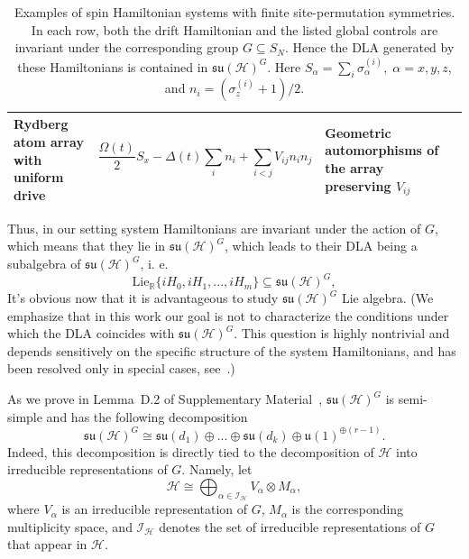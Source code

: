 \documentclass[10pt,twocolumn,superscriptaddress,aps,amsmath,amssymb,citeautoscript,floatfix,prx,longbibliography]{revtex4-2}
\newcounter{alg}
\theoremstyle{plain}
\theoremstyle{plain}
\theoremstyle{plain}
\theoremstyle{plain}
\theoremstyle{plain}
\theoremstyle{plain}
\begin{document}
\begin{table}[t]
\begin{tabular}{llll}
\parbox[t]{0.19\textwidth}{Rydberg atom array with uniform drive}
&
\parbox[t]{0.38\textwidth}{
\[
\frac{\Omega(t)}{2}S_x
-\Delta(t)\sum_i n_i
+\sum_{i<j}V_{ij}n_in_j
\]
}
&
\parbox[t]{0.22\textwidth}{
Geometric automorphisms of the array preserving \(V_{ij}\)
}
&
\parbox[t]{0.13\textwidth}{
\cite{Browaeys2020,Daley2022}
}
\\

\hline
\end{tabular}
\caption{
Examples of spin Hamiltonian systems with finite site-permutation symmetries. In each row, both the drift Hamiltonian and the listed global controls are invariant under the corresponding group \(G\subseteq S_N\). Hence the DLA generated by these Hamiltonians is contained in
\(\mathfrak{su}(\mathcal H)^G\). Here $S_{\alpha}=\sum_i \sigma_{\alpha}^{(i)}, \; \alpha=x, y, z$, and $n_i=\left(\sigma_z^{(i)}+1\right) / 2$.
}
\end{table}

Thus, in our setting system Hamiltonians are invariant under the action of $G$, which means that they lie in $\mathfrak{su}(\mathcal{H})^G$, which leads to their DLA being a subalgebra of $\mathfrak{su}(\mathcal{H})^G$, i. e.
\[
    \mathrm{Lie}_{\mathbb{R}}\{ iH_0, iH_1, ..., iH_m \}\subseteq \mathfrak{su}(\mathcal{H})^G,
\]
It's obvious now that it is advantageous to study $\mathfrak{su}(\mathcal{H})^G$ Lie algebra. (We emphasize that in this work our goal is not to characterize the conditions under which the DLA coincides with \(\mathfrak{su}(\mathcal{H})^G\). This question is highly nontrivial and depends sensitively on the specific structure of the system Hamiltonians, and has been resolved only in special cases, see~\cite{Albertini2020, Kokcu2024, Wiersema2024}.)  

As we prove in Lemma~D.2 of Supplementary Material~\cite{SuppMat}, $\mathfrak{su}(\mathcal{H})^G$ is semi-simple and has the following decomposition
\begin{equation}\label{eq:inv_alg_decomp}
    \mathfrak{su}(\mathcal{H})^G\cong \mathfrak{su}(d_1)\oplus...\oplus\mathfrak{su}(d_k)\oplus \mathfrak{u}(1)^{\oplus(r-1)}.
\end{equation}
Indeed, this decomposition is directly tied to the decomposition of \(\mathcal H\) into irreducible representations of \(G\). Namely, let
\begin{equation}\label{eq:H_G_irrep_decomp}
    \mathcal H
    \cong
    \bigoplus_{\alpha\in\mathcal I_{\mathcal H}}
    V_\alpha\otimes M_\alpha,
\end{equation}
where \(V_\alpha\) is an irreducible representation of \(G\), \(M_\alpha\) is the corresponding multiplicity space, and \(\mathcal I_{\mathcal H}\) denotes the set of irreducible representations of \(G\) that appear in \(\mathcal H\).
\end{document}
